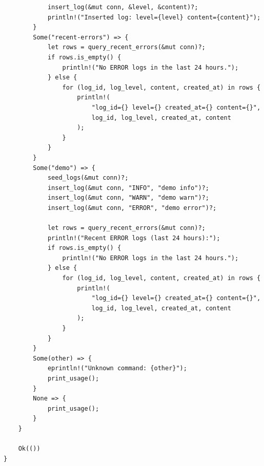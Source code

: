 \documentclass[12pt,a4paper]{ctexart}
\begin{document}
\begin{lstlisting}
            insert_log(&mut conn, &level, &content)?;
            println!("Inserted log: level={level} content={content}");
        }
        Some("recent-errors") => {
            let rows = query_recent_errors(&mut conn)?;
            if rows.is_empty() {
                println!("No ERROR logs in the last 24 hours.");
            } else {
                for (log_id, log_level, content, created_at) in rows {
                    println!(
                        "log_id={} level={} created_at={} content={}",
                        log_id, log_level, created_at, content
                    );
                }
            }
        }
        Some("demo") => {
            seed_logs(&mut conn)?;
            insert_log(&mut conn, "INFO", "demo info")?;
            insert_log(&mut conn, "WARN", "demo warn")?;
            insert_log(&mut conn, "ERROR", "demo error")?;

            let rows = query_recent_errors(&mut conn)?;
            println!("Recent ERROR logs (last 24 hours):");
            if rows.is_empty() {
                println!("No ERROR logs in the last 24 hours.");
            } else {
                for (log_id, log_level, content, created_at) in rows {
                    println!(
                        "log_id={} level={} created_at={} content={}",
                        log_id, log_level, created_at, content
                    );
                }
            }
        }
        Some(other) => {
            eprintln!("Unknown command: {other}");
            print_usage();
        }
        None => {
            print_usage();
        }
    }

    Ok(())
}

\end{lstlisting}
\end{document}
